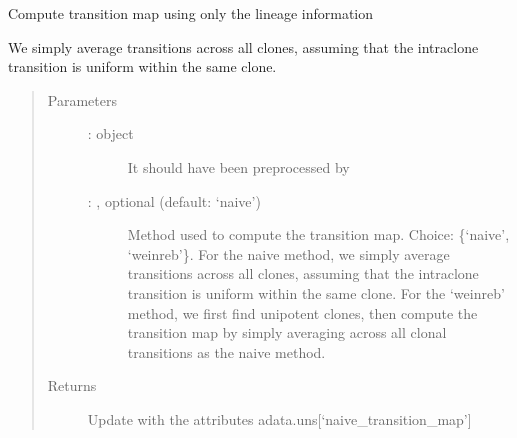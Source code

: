 \documentclass[letterpaper,10pt,english]{sphinxmanual}
\begin{document}
\begin{fulllineitems}
\label{\detokenize{cospar.tmap.infer_Tmap_from_clonal_info_alone:cospar.tmap.infer_Tmap_from_clonal_info_alone}}
Compute transition map using only the lineage information

We simply average transitions across all clones, assuming that
the intra\sphinxhyphen{}clone transition is uniform within the same clone.
\begin{quote}\begin{description}
\item[{Parameters}] \leavevmode\begin{description}
\item[{ :  object}] \leavevmode
It should have been preprocessed by {\hyperref[\detokenize{cospar.tmap.select_time_points:cospar.tmap.select_time_points}]{}}

\item[{ : , optional (default: ‘naive’)}] \leavevmode
Method used to compute the transition map. Choice: \{‘naive’,
‘weinreb’\}. For the naive method, we simply average transitions
across all clones, assuming that the intra\sphinxhyphen{}clone transition is
uniform within the same clone. For the ‘weinreb’ method, we first
find uni\sphinxhyphen{}potent clones, then compute the transition map by simply
averaging across all clonal transitions as the naive method.

\end{description}

\item[{Returns}] \leavevmode
Update  with the attributes adata.uns{[}‘naive\_transition\_map’{]}

\end{description}\end{quote}

\end{fulllineitems}


\end{document}
